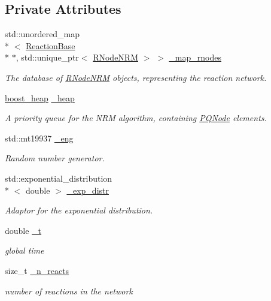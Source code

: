 \subsection*{Private Attributes}
\begin{DoxyCompactItemize}
\item 
std\-::unordered\-\_\-map\\*
$<$ \hyperlink{classchem_1_1ReactionBase}{Reaction\-Base} \\*
$\ast$, std\-::unique\-\_\-ptr$<$ \hyperlink{classchem_1_1RNodeNRM}{R\-Node\-N\-R\-M} $>$ $>$ \hyperlink{classchem_1_1ChemNRMImpl_a8eb526f8bc56b8aeeadca537004576db}{\-\_\-map\-\_\-rnodes}
\begin{DoxyCompactList}\small\item\em The database of \hyperlink{classchem_1_1RNodeNRM}{R\-Node\-N\-R\-M} objects, representing the reaction network. \end{DoxyCompactList}\item 
\hyperlink{namespacechem_aacd1d2bb93e0bb1b1af9bb1fbb5133ca}{boost\-\_\-heap} \hyperlink{classchem_1_1ChemNRMImpl_af2063c9b768c13ac541886947c567c1f}{\-\_\-heap}
\begin{DoxyCompactList}\small\item\em A priority queue for the N\-R\-M algorithm, containing \hyperlink{classchem_1_1PQNode}{P\-Q\-Node} elements. \end{DoxyCompactList}\item 
std\-::mt19937 \hyperlink{classchem_1_1ChemNRMImpl_ad0dce1073a3c37dd21c6523a81dd18e6}{\-\_\-eng}
\begin{DoxyCompactList}\small\item\em Random number generator. \end{DoxyCompactList}\item 
std\-::exponential\-\_\-distribution\\*
$<$ double $>$ \hyperlink{classchem_1_1ChemNRMImpl_ac817f5c731ea5522ea661a9e6c978d6a}{\-\_\-exp\-\_\-distr}
\begin{DoxyCompactList}\small\item\em Adaptor for the exponential distribution. \end{DoxyCompactList}\item 
double \hyperlink{classchem_1_1ChemNRMImpl_a1b14f424d72d3c5b0aafe31d7b7c4f82}{\-\_\-t}
\begin{DoxyCompactList}\small\item\em global time \end{DoxyCompactList}\item 
size\-\_\-t \hyperlink{classchem_1_1ChemNRMImpl_a7e53992b28e926d1a19f3fd7dea171c3}{\-\_\-n\-\_\-reacts}
\begin{DoxyCompactList}\small\item\em number of reactions in the network \end{DoxyCompactList}\end{DoxyCompactItemize}


